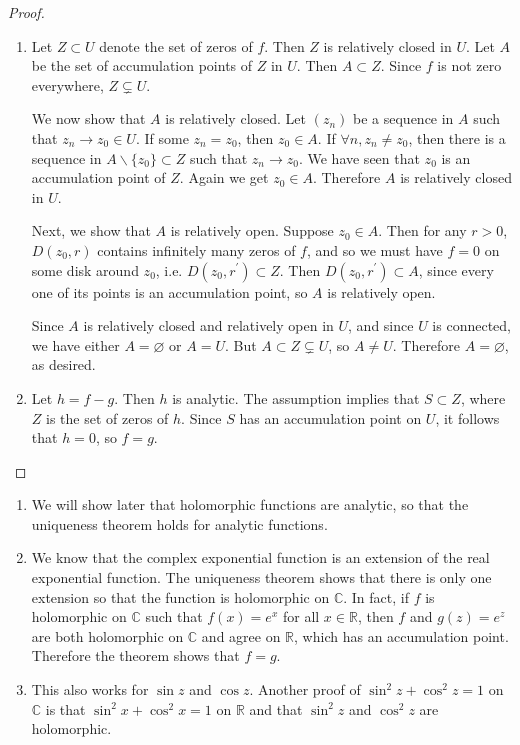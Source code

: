 \begin{proof}
  \begin{enumerate}[label=(\alph*)]
    \item{
      Let $Z \subset U$ denote the set of zeros of $f$. Then $Z$ is
      relatively closed in $U$. Let $A$ be the set of
      accumulation points of $Z$ in $U$. Then $A \subset Z$.
      Since $f$ is not zero everywhere, $Z \subsetneq U$.

      We now show that $A$ is relatively closed.
      Let $(z_n)$ be a sequence in $A$ such that $z_n \to z_0 \in U$.
      If some $z_n = z_0$, then $z_0 \in A$. If
      $\forall n, z_n \neq z_0$, then there is a sequence in
      $A \backslash \{ z_0 \} \subset Z$ such that $z_n \to z_0$.
      We have seen that $z_0$ is an accumulation point of $Z$.
      Again we get $z_0 \in A$. Therefore $A$ is relatively closed in
      $U$.

      Next, we show that $A$ is relatively open. Suppose $z_0 \in A$. Then for any
      $r > 0$, $D(z_0, r)$ contains infinitely many zeros of $f$, and so
      we must have $f = 0$ on some disk around $z_0$, i.e.
      $D(z_0, r^\prime) \subset Z$. Then $D(z_0, r^\prime) \subset A$,
      since every one of its points is an accumulation point, so
      $A$ is relatively open.

      Since $A$ is relatively closed and relatively open in $U$, and since
      $U$ is connected, we have either $A = \varnothing$ or $A = U$. But
      $A \subset Z \subsetneq U$, so $A \neq U$. Therefore $A = \varnothing$,
      as desired.
    }
    \item{
      Let $h = f - g$. Then $h$ is analytic. The assumption implies that
      $S \subset Z$, where $Z$ is the set of zeros of $h$. Since $S$ has
      an accumulation point on $U$, it follows that $h = 0$, so $f = g$.
    }
  \end{enumerate}
\end{proof}

\begin{remark}
  \begin{enumerate}
    \item{
      We will show later that holomorphic functions are analytic,
      so that the uniqueness theorem holds for analytic functions.
    }
    \item{
      We know that the complex exponential function is an extension
      of the real exponential function. The uniqueness theorem shows
      that there is only one extension so that the function is
      holomorphic on $\mathbb{C}$. In fact, if $f$ is holomorphic on
      $\mathbb{C}$ such that $f(x) = e^x$ for all $x \in \mathbb{R}$,
      then $f$ and $g(z) = e^z$ are both holomorphic on $\mathbb{C}$
      and agree on $\mathbb{R}$, which has an accumulation point.
      Therefore the theorem shows that $f = g$.
    }
    \item{
      This also works for $\sin z$ and $\cos z$. Another proof of
      $\sin^2 z + \cos^2 z = 1$ on $\mathbb{C}$ is that
      $\sin^2 x + \cos^2 x = 1$ on $\mathbb{R}$ and that
      $\sin^2 z$ and $\cos^2 z$ are holomorphic.
    }
  \end{enumerate}
\end{remark}
